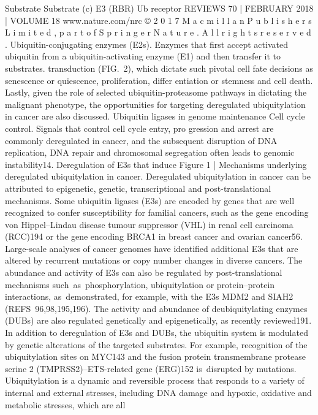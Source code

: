 Substrate
Substrate
(c)
E3 (RBR)
Ub receptor
REVIEWS
70 | FEBRUARY 2018 | VOLUME 18
www.nature.com/nrc
©
 2
0
1
7
 M
a
c
m
i
l
l
a
n
 P
u
b
l
i
s
h
e
r
s
 L
i
m
i
t
e
d
,
 p
a
r
t
 o
f
 S
p
r
i
n
g
e
r
 N
a
t
u
r
e
.
 A
l
l
 r
i
g
h
t
s
 r
e
s
e
r
v
e
d
.
Ubiquitin-conjugating
enzymes
(E2s). Enzymes that first accept
activated ubiquitin from a
ubiquitin-activating enzyme (E1)
and then transfer it to
substrates.
transduction (FIG. 2), which dictate such pivotal cell fate
decisions as senescence or quiescence, proliferation, differ­
entiation or stemness and cell death. Lastly, given the role
of selected ubiquitin-proteasome pathways in dictating
the malignant phenotype, the opportunities for targeting
deregulated ubiquitylation in cancer are also discussed.
Ubiquitin ligases in genome maintenance
Cell cycle control. Signals that control cell cycle entry, pro­
gression and arrest are commonly deregulated in ­cancer,
and the subsequent disruption of DNA replication,
DNA repair and chromosomal segregation often leads
to genomic instability14. Deregulation of E3s that induce
Figure 1 | Mechanisms underlying deregulated ubiquitylation in cancer.
Deregulated ubiquitylation in cancer can be attributed to epigenetic, genetic,
transcriptional and post-translational mechanisms. Some ubiquitin ligases
(E3s) are encoded by genes that are well recognized to confer susceptibility
for familial cancers, such as the gene encoding von Hippel–Lindau disease
tumour suppressor (VHL) in renal cell carcinoma (RCC)194 or the gene encoding
BRCA1 in breast cancer and ovarian cancer56. Large-scale analyses of cancer
genomes have identified additional E3s that are altered by recurrent
mutations or copy number changes in diverse cancers. The abundance and
activity of E3s can also be regulated by post-translational mechanisms
such as phosphorylation, ubiquitylation or protein–protein interactions,
as demonstrated, for example, with the E3s MDM2 and SIAH2
(REFS 96,98,195,196). The activity and abundance of deubiquitylating enzymes
(DUBs) are also regulated genetically and epigenetically, as recently
reviewed191. In addition to deregulation of E3s and DUBs, the ubiquitin system
is modulated by genetic alterations of the targeted substrates. For example,
recognition of the ubiquitylation sites on MYC143 and the fusion protein
transmembrane protease serine 2 (TMPRSS2)–ETS-related gene (ERG)152
is disrupted by mutations. Ubiquitylation is a dynamic and reversible process
that responds to a variety of internal and external stresses, including DNA
damage and hypoxic, oxidative and metabolic stresses, which are all
